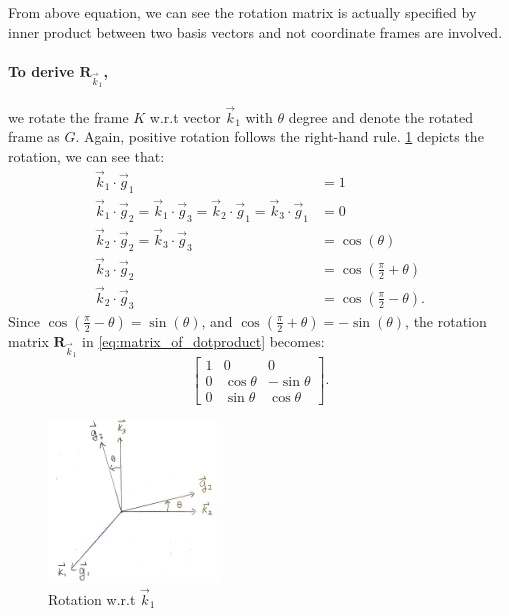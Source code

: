 \documentclass{article}
\newcommand{\mat}[1]{\mathbf{#1}}
\newcommand{\MR}{\mat{R}}
\begin{document}
From above equation, we can see the rotation matrix is actually specified by inner product between two basis vectors and not coordinate frames are involved. 

\paragraph{To derive $\MR_{\vec{k}_1}$,} we rotate the frame $K$ w.r.t vector $\vec{k}_1$ with $\theta$ degree and denote the rotated frame as $G$. Again,  positive rotation follows the right-hand rule. \cref{fig:first_rotation} depicts the rotation, we can see that:
\begin{align*}
    \vec{k}_1\cdot\vec{g}_1 &= 1 \\
    \vec{k}_1\cdot\vec{g}_2 = \vec{k}_1\cdot\vec{g}_3 = \vec{k}_2\cdot\vec{g}_1 = \vec{k}_3\cdot\vec{g}_1 &= 0 \\
    \vec{k}_2\cdot\vec{g}_2 = \vec{k}_3\cdot\vec{g}_3 &=\cos{(\theta)}\\
    \vec{k}_3\cdot\vec{g}_2 &=\cos{(\frac{\pi}{2} + \theta)} \\
    \vec{k}_2\cdot\vec{g}_3 &=\cos{(\frac{\pi}{2} - \theta)}.
\end{align*}
Since $\cos{(\frac{\pi}{2} - \theta)} = \sin{(\theta)}$, and $\cos{(\frac{\pi}{2} + \theta)} = -\sin{(\theta)}$, the rotation matrix $\MR_{\vec{k}_1}$ in \cref{eq:matrix_of_dotproduct} becomes:
\begin{equation*}
    \begin{bmatrix}
      1 & 0 & 0 \\
      0 & \cos{\theta} & -\sin{\theta} \\
      0 & \sin{\theta} & \cos{\theta}
    \end{bmatrix}.
\end{equation*}

\begin{figure}[h]
    \centering
    \includegraphics[width=0.4\textwidth]{Figures/UWS-rotation-first.png}
    \caption{Rotation w.r.t $\vec{k}_1$}
    \label{fig:first_rotation}
\end{figure}
\end{document}
